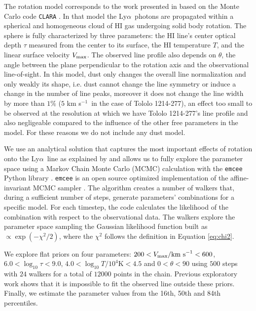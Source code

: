 \documentclass[a4,useAMS,usenatbib,usegraphicx]{mn2e}
\newcommand{\tol}{Tololo 1214-277}
\newcommand{\lya}{Ly$\alpha$}
\newcommand{\kms}{km s$^{-1}$}
\begin{document}
The rotation model corresponds to the work presented in
\citep{GaravitoCamargo2014} based on the Monte Carlo code
\texttt{CLARA} \citep{CLARA}. 
In that model the \lya\ photons are propagated 
within a spherical and homogeneous cloud of HI gas undergoing solid
body rotation.
The sphere is fully characterized by three parameters: the HI line's
center optical  depth $\tau$ measured from the center to its surface, the HI
temperature $T$, and the linear surface velocity $V_{\rm max}$.  
The observed line profile also depends on $\theta$,  the angle between the plane
perpendicular to the rotation axis and the observational
line-of-sight.  
In this model, dust only changes the overall line
normalization and only weakly its shape, i.e. 
dust cannot change the line symmetry or induce a change in the number
of line peaks, moreover it does not change the line width by more than
$1\%$ ($5$ \kms\ in the case of \tol), an effect too small to be
observed at the resolution at which we have \tol's line profile and
also negligeable compared to the influence of the other free parameters in the model.
For these reasons we do not include any dust model. 

We use an analytical solution that captures the most important
effects of rotation onto the \lya\ line as explained by
\citet{GaravitoCamargo2014} and allows us to fully explore the
parameter space using a Markov Chain Monte Carlo (MCMC) calculation with the
\texttt{emcee} Python library \citep{2013PASP..125..306F}. \texttt{emcee} 
is an open source optimized implementation of the affine-invariant 
MCMC sampler \citep{goodman2010ensemble}. 
The algorithm creates a number of walkers that,
during a sufficient number of steps, generate parameters' combinations
for a specific model.
For each timestep, the code calculates the likelihood of the
combination with respect to the observational data.
The walkers explore the parameter space sampling the Gaussian likelihood
function built as $\propto \exp(-\chi^2/2)$, where the $\chi^2$ follows
the definition in Equation \ref{eq:chi2}. 
 

We explore flat priors on four parameters: $200<V_{\rm
  max}/\mathrm{km\ s}^{-1} <600$,   $6.0<\log_{10}\tau<9.0$,
$4.0<\log_{10} T/10^4\mathrm{K}< 4.5$ and $0<\theta<90$ using $500$
steps with $24$ walkers for a total of $12000$ points in the chain.
Previous exploratory work shows that it is impossible to fit the
observed line outside these priors.
Finally, we estimate the parameter values from the 16th, 50th and 84th
percentiles. 
\end{document}
